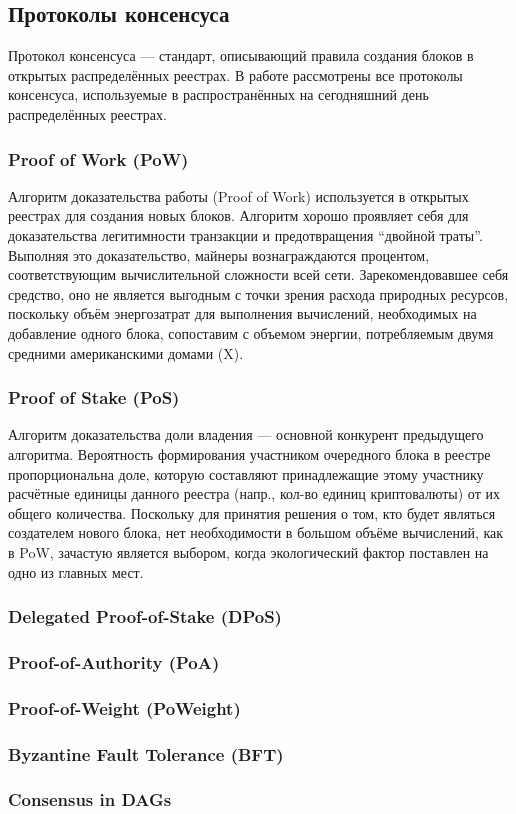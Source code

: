 \subsection{Протоколы консенсуса}\label{consensus_protocols}
Протокол консенсуса --- стандарт, описывающий правила создания блоков в
открытых распределённых реестрах. В работе рассмотрены все протоколы
консенсуса, используемые в распространённых на сегодняшний день распределённых
реестрах.
\subsubsection{Proof of Work (PoW)}\label{pow}
Алгоритм доказательства работы (Proof of Work) используется в открытых реестрах
для создания новых блоков. Алгоритм хорошо проявляет себя для доказательства
легитимности транзакции и предотвращения ``двойной траты''.  Выполняя это
доказательство, майнеры вознаграждаются процентом, соответствующим
вычислительной сложности всей сети. Зарекомендовавшее себя средство, оно не
является выгодным с точки зрения расхода природных ресурсов, поскольку объём
энергозатрат для выполнения вычислений, необходимых на добавление одного блока,
сопоставим с объемом энергии, потребляемым двумя средними американскими домами (X).
\subsubsection{Proof of Stake (PoS)}
Алгоритм доказательства доли владения --- основной конкурент предыдущего
алгоритма. Вероятность формирования участником очередного блока в реестре
пропорциональна доле, которую составляют принадлежащие этому участнику
расчётные единицы данного реестра (напр., кол-во единиц криптовалюты) от их
общего количества. Поскольку для принятия решения о том, кто будет являться
создателем нового блока, нет необходимости в большом объёме вычислений, как в
PoW, зачастую является выбором, когда экологический фактор поставлен на одно из
главных мест.
\subsubsection{Delegated Proof-of-Stake (DPoS)}
\subsubsection{Proof-of-Authority (PoA)}
\subsubsection{Proof-of-Weight (PoWeight)}
\subsubsection{Byzantine Fault Tolerance (BFT)}
\subsubsection{Consensus in DAGs}
